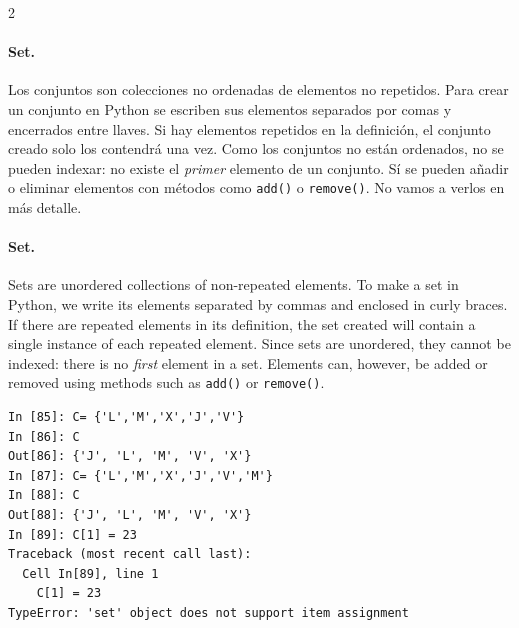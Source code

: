 \begin{paracol}{2}
\paragraph{Set.} Los conjuntos son colecciones no ordenadas de elementos no repetidos. Para crear un conjunto en Python se escriben sus elementos separados por comas y encerrados entre llaves. Si hay elementos repetidos en la definición, el conjunto creado solo los contendrá una vez. Como los conjuntos no están ordenados, no se pueden indexar: no existe el \emph{primer} elemento de un conjunto. Sí se pueden añadir o eliminar elementos con métodos como \texttt{add()} o \texttt{remove()}. No vamos a verlos en más detalle.
\switchcolumn
\paragraph{Set.} Sets are unordered collections of non-repeated elements. To make a set in Python, we write its elements separated by commas and enclosed in curly braces. If there are repeated elements in its definition, the set created will contain a single instance of each repeated element. Since sets are unordered, they cannot be indexed: there is no \emph{first} element in a set. Elements can, however, be added or removed using methods such as \texttt{add()} or \texttt{remove()}.
\end{paracol}

\begin{center}
\begin{minipage}{0.4\textwidth}
\begin{verbatim}
In [85]: C= {'L','M','X','J','V'}
In [86]: C
Out[86]: {'J', 'L', 'M', 'V', 'X'}
In [87]: C= {'L','M','X','J','V','M'}
In [88]: C
Out[88]: {'J', 'L', 'M', 'V', 'X'}
In [89]: C[1] = 23
Traceback (most recent call last):
  Cell In[89], line 1
    C[1] = 23
TypeError: 'set' object does not support item assignment
\end{verbatim}
\end{minipage}
\end{center}

